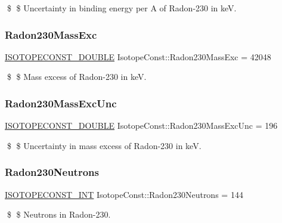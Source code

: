 \$ \$ Uncertainty in binding energy per A of Radon-\/230 in keV. \mbox{\label{group___isotope_const-_radon-_rn230_ga723218f9f0b3d69e4cda1f313a99643c}} 
\subsubsection{\texorpdfstring{Radon230\+Mass\+Exc}{Radon230MassExc}}
{\footnotesize\ttfamily \mbox{\hyperlink{group___isotope_const-_macros_ga8f45a7272ce02c0b4c65c44636ed719a}{I\+S\+O\+T\+O\+P\+E\+C\+O\+N\+S\+T\+\_\+\+D\+O\+U\+B\+LE}} Isotope\+Const\+::\+Radon230\+Mass\+Exc = 42048}

\$ \$ Mass excess of Radon-\/230 in keV. \mbox{\label{group___isotope_const-_radon-_rn230_gaffed2a1abc46092934223455cf65e6a4}} 
\subsubsection{\texorpdfstring{Radon230\+Mass\+Exc\+Unc}{Radon230MassExcUnc}}
{\footnotesize\ttfamily \mbox{\hyperlink{group___isotope_const-_macros_ga8f45a7272ce02c0b4c65c44636ed719a}{I\+S\+O\+T\+O\+P\+E\+C\+O\+N\+S\+T\+\_\+\+D\+O\+U\+B\+LE}} Isotope\+Const\+::\+Radon230\+Mass\+Exc\+Unc = 196}

\$ \$ Uncertainty in mass excess of Radon-\/230 in keV. \mbox{\label{group___isotope_const-_radon-_rn230_gadb39650767de41460a7be4d26518deb3}} 
\subsubsection{\texorpdfstring{Radon230\+Neutrons}{Radon230Neutrons}}
{\footnotesize\ttfamily \mbox{\hyperlink{group___isotope_const-_macros_ga5f18360b3e99483a35c32d789e62621c}{I\+S\+O\+T\+O\+P\+E\+C\+O\+N\+S\+T\+\_\+\+I\+NT}} Isotope\+Const\+::\+Radon230\+Neutrons = 144}

\$ \$ Neutrons in Radon-\/230. \mbox{\label{group___isotope_const-_radon-_rn230_ga483fffcf3c26c46637fa826e6796b7d2}} 
